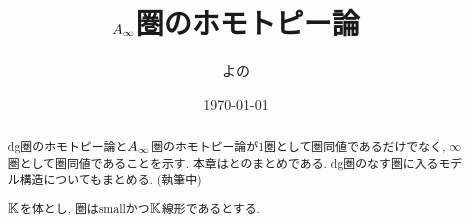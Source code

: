 \documentclass[uplatex, a4paper, 14Q, dvipdfmx]{jsarticle}
\title{\texorpdfstring{$A_{\infty}$}{Ainf}圏のホモトピー論}
\author{よの}
\date{\today}
\begin{document}
\maketitle

\begin{abstract}
  dg圏のホモトピー論と$A_{\infty}$圏のホモトピー論が1圏として圏同値であるだけでなく, $\infty$圏として圏同値であることを示す. 
  本章は\cite{CNS20}と\cite{Pas23}のまとめである. 
  dg圏のなす圏に入るモデル構造についてもまとめる. (執筆中)

  $\mathbb{K}$を体とし, 圏はsmallかつ$\mathbb{K}$線形であるとする.
\end{abstract}

\tableofcontents




\end{document}
